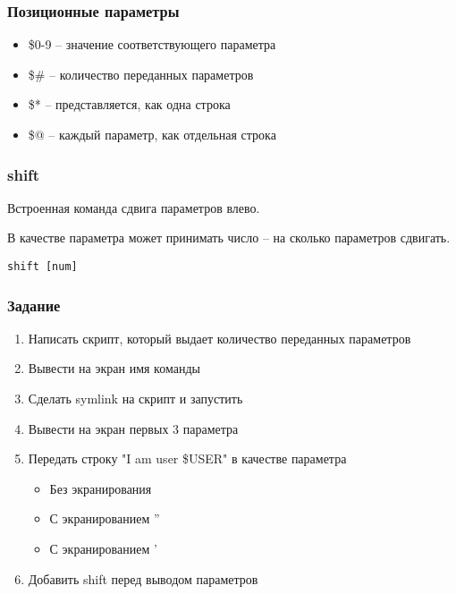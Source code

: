 
\begin{frame}
	\frametitle{Позиционные параметры}

	\begin{itemize}
		\item \$0-9 -- значение соответствующего параметра
		\item \$\# -- количество переданных параметров
		\item \$* -- представляется, как одна строка
		\item \$@ -- каждый параметр, как отдельная строка
	\end{itemize}

\end{frame}


\begin{frame}[fragile]
	\frametitle{shift}

	Встроенная команда сдвига параметров влево.

	В качестве параметра может принимать число -- на сколько параметров сдвигать.

	\begin{lstlisting}
shift [num]
	\end{lstlisting}

\end{frame}


\begin{frame}
	\frametitle{Задание}

	\begin{enumerate}
		\item Написать скрипт,  который выдает количество переданных параметров
			\pause
		\item Вывести на экран имя команды
			\pause
		\item Сделать symlink на скрипт и запустить
			\pause
		\item Вывести на экран первых 3 параметра
			\pause
		\item Передать строку "I am user \$USER" в качестве параметра
			\begin{itemize}
				\item Без экранирования
				\item С экранированием ''
				\item С экранированием '
			\end{itemize}
			\pause
		\item Добавить shift перед выводом параметров
	\end{enumerate}
\end{frame}


